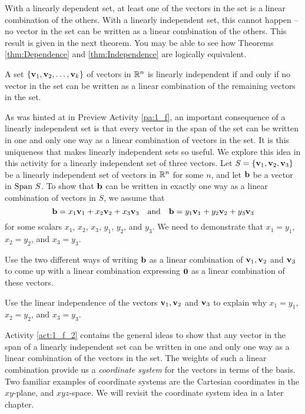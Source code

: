 With a linearly dependent set, at least one of the vectors in the set is a linear combination of the others. With a linearly independent set, this cannot happen -- no vector in the set can be written as a linear combination of the others. This result is given in the next theorem. You may be able to see how Theorems \ref{thm:Dependence} and \ref{thm:Independence} are logically equivalent.  


\begin{theorem} \label{thm:Independence} A set $\{\mathbf{v}_1, \mathbf{v}_2, \ldots, \mathbf{v}_k\}$ of vectors in $\mathbb{R}^n$ is linearly independent if and only if no vector in the set can be written as a linear combination of the remaining vectors in the set.
\end{theorem}


\begin{activity} \label{act:1_f_2}  As was hinted at in Preview Activity \ref{pa:1_f}, an important consequence of a linearly independent set is that every vector in the span of the set can be written in one and only one way as a linear combination of vectors in the set. It is this uniqueness that makes linearly independent sets so useful. We explore this idea in this activity for a linearly independent set of three vectors. Let $S = \{\mathbf{v}_1, \mathbf{v}_2, \mathbf{v}_3\}$ be a linearly independent set of vectors in $\mathbb{R}^n$ for some $n$, and let $\mathbf{b}$ be a vector in $\text{Span} \ S$. To show that $\mathbf{b}$ can be written in exactly one way as a linear combination of vectors in $S$, we assume that 
\[\mathbf{b} = x_1 \mathbf{v}_1 + x_2 \mathbf{v}_2 + x_3 \mathbf{v}_3 \ \ \text{ and } \ \ \mathbf{b} = y_1\mathbf{v}_1 + y_2 \mathbf{v}_2 + y_3 \mathbf{v}_3\]
for some scalars $x_1$, $x_2$, $x_3$, $y_1$, $y_2$, and $y_3$. We need to demonstrate that $x_1=y_1$, $x_2=y_2$, and  $x_3=y_3$. 
	\ba
	\item Use the two different ways of writing $\mathbf{b}$ as a linear combination of $\mathbf{v}_1, \mathbf{v}_2$ and $\mathbf{v}_3$ to come up with a linear combination expressing $\mathbf{0}$ as a linear combination of these vectors.	
	
	\item Use the linear independence of the vectors $\mathbf{v}_1, \mathbf{v}_2$ and $\mathbf{v}_3$ to explain why $x_1=y_1$, $x_2=y_2$, and  $x_3=y_3$.
	
	\ea
\end{activity}



Activity \ref{act:1_f_2} contains the general ideas to show that any vector in the span of a linearly independent set can be written in one and only one way as a linear combination of the vectors in the set. The weights of such a linear combination provide us a \emph{coordinate system} for the vectors in terms of the basis. Two familiar examples of coordinate systems are the Cartesian coordinates in the $xy$-plane, and $xyz$-space. We will revisit the coordinate system idea in a later chapter. 

